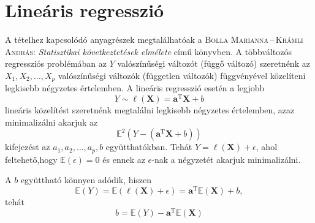 \documentclass[%
	DIV=15,appendixprefix]{scrreprt}
\theoremstyle{definition}
\theoremstyle{remark}
\newcommand{\mean}{\mathbb{E}}
\DeclareMathOperator{\T}{T}
\begin{document}
\section{Lineáris regresszió}
A tételhez kapcsolódó anyagrészek megtalálhatóak a \textsc{Bolla Marianna\,--\,Krámli András}:
\emph{Statisztikai következtetések elmélete} \cite[6.3--6.5.~szakaszok]{BollaKramli} című könyvben.
%
A többváltozós regressziós problémában az $ Y $ valószínűségi változót (függő változó) szeretnénk az
$ X_{ 1 },{} X_{ 2 },{} \ldots,{} X_{ p } $ valószínűségi változók (független változók) függvényével
közelíteni legkisebb négyzetes értelemben. A lineáris regresszió esetén a legjobb
\begin{equation*}
	Y \sim \ell \left( \mathbf{ X } \right) = \mathbf{ a }^{ \T } \mathbf{ X } + b
\end{equation*}
lineáris közelítést szeretnénk megtalálni legkisebb négyzetes értelemben, azaz minimalizálni akarjuk
az
\begin{equation*}
	\mean^{ 2 } \left( Y - \left( \mathbf{ a }^{ \T } \mathbf{ X } + b  \right) \right)
\end{equation*}
kifejezést az $ a_{ 1 },{} a_{ 2 },{} \ldots,{} a_{ p },{} b $ együtthatókban. Tehát $ Y = \ell
\left( \mathbf{ X } \right) + \epsilon $, ahol feltehető,hogy $ \mean \left(
\epsilon \right) = 0 $ és ennek az $ \epsilon $-nak a négyzetét akarjuk minimalizálni.

A $ b $ együttható könnyen adódik, hiszen
\begin{equation*}
	\mean \left( Y \right) = \mean \left( \ell \left( \mathbf{ X } \right) + \epsilon \right) =
	\mathbf{ a }^{ \T } \mean \left( \mathbf{ X } \right) + b,
\end{equation*}
tehát
\begin{equation*}
	b = \mean \left( Y \right) - \mathbf{ a }^{ \T } \mean \left( \mathbf{ X } \right)
\end{equation*}
\end{document}
